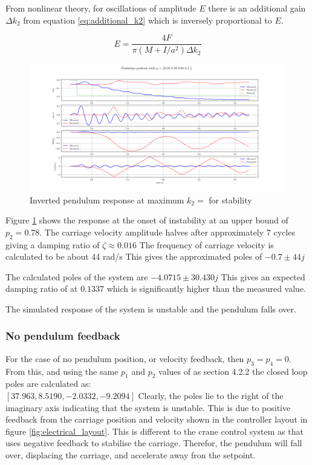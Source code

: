 \documentclass{article}
\begin{document}
From nonlinear theory, for oscillations of amplitude $E$ there is an additional gain $\Delta k_2$ from equation \ref{eq:additional_k2} which is inversely proportional to $E$.

\begin{equation}
  E = \frac{4F}{\pi(M + I/a^2)\Delta k_2}
\end{equation}

\begin{figure}[H]
  \centering
  \includegraphics[width=0.99\textwidth]{figures/4.4_hi.png}
  \caption{Inverted pendulum response at maximum $k_2 = $ for stability}
  \label{fig:roots4.4_hi}
\end{figure}

Figure \ref{fig:roots4.4_hi} shows the response at the onset of instability at an upper bound of $p_2 = 0.78$.
The carriage velocity amplitude halves after approximately 7 cycles giving a damping ratio of $\zeta \approx 0.016$
The frequency of carriage velocity is calculated to be about 44 rad/s
This gives the approximated poles of $-0.7 \pm 44j$

The calculated poles of the system are $-4.0715 \pm 30.430j$
This gives an expected damping ratio of at $0.1337$ which is significantly higher than the measured value.

The simulated response of the system is unstable and the pendulum falls over.

\subsubsection{No pendulum feedback}

For the case of no pendulum position, or velocity feedback, then $p_3 = p_4 = 0$.
From this, and using the same $p_1$ and $p_2$ values of as section 4.2.2 the closed loop poles are calculated as: \\
$[37.963,  8.5190, -2.0332, -9.2094]$
Clearly, the poles lie to the right of the imaginary axis indicating that the system is unstable.
This is due to positive feedback from the carriage position and velocity shown in the controller layout in figure \ref{fig:electrical_layout}.
This is different to the crane control system as that uses negative feedback to stabilise the carriage.
Therefor, the pendulum will fall over, displacing the carriage, and accelerate away fron the setpoint.
\end{document}
